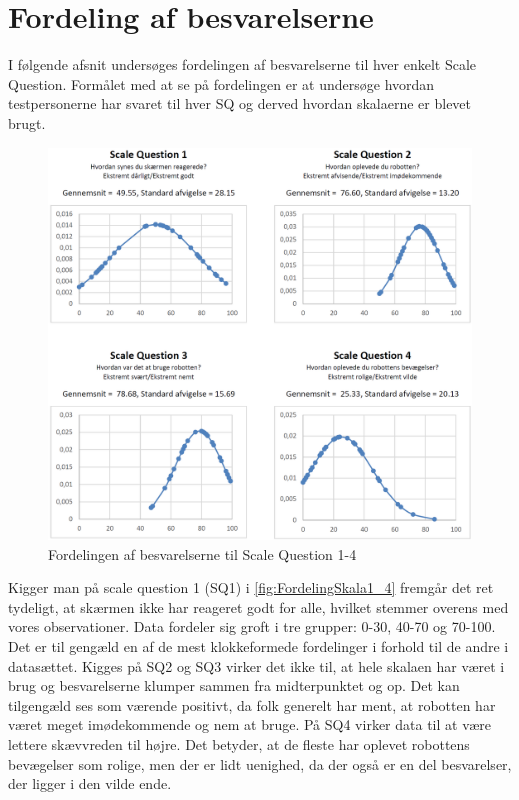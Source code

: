 \section{Fordeling af besvarelserne}
\label{TestAfSkalaFordelingAfBesvarelserne}
%
I følgende afsnit undersøges fordelingen af besvarelserne til hver enkelt Scale Question. Formålet med at se på fordelingen er at undersøge hvordan testpersonerne har svaret til hver SQ og derved hvordan skalaerne er blevet brugt. 
%
\begin{figure}[H]
\centering
\includegraphics[width =\textwidth]{Figure/DatabehandlingSkalaer/FordelingSkala1_4} 
\caption{Fordelingen af besvarelserne til Scale Question 1-4}
\label{fig:FordelingSkala1_4}
\end{figure}
\noindent
%
Kigger man på scale question 1 (SQ1) i \autoref{fig:FordelingSkala1_4} fremgår det ret tydeligt, at skærmen ikke har reageret godt for alle, hvilket stemmer overens med vores observationer. Data fordeler sig groft i tre grupper: 0-30, 40-70 og 70-100. Det er til gengæld en af de mest klokkeformede fordelinger i forhold til de andre i datasættet. Kigges på SQ2 og SQ3 virker det ikke til, at hele skalaen har været i brug og besvarelserne klumper sammen fra midterpunktet og op. Det kan tilgengæld ses som værende positivt, da folk generelt har ment, at robotten har været meget imødekommende og nem at bruge. På SQ4 virker data til at være lettere skævvreden til højre. Det betyder, at de fleste har oplevet robottens bevægelser som rolige, men der er lidt uenighed, da der også er en del besvarelser, der ligger i den vilde ende.
